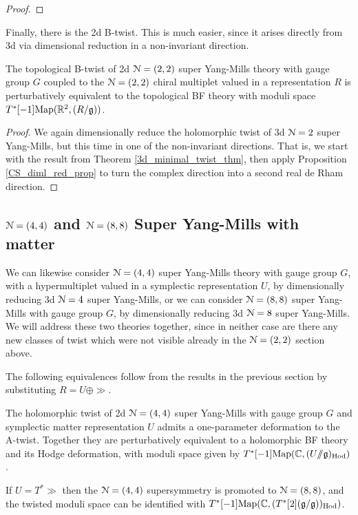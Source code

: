 \documentclass[10pt, oneside]{article}
\newcommand{\ham}{/\!\!/}
\begin{document}
\begin{proof}
 
\end{proof}

Finally, there is the 2d B-twist.  This is much easier, since it arises directly from 3d via dimensional reduction in a non-invariant direction.
\begin{theorem} \label{2d_2_B_twist_thm}
The topological B-twist of 2d $\mathcal{N}=(2,2)$ super Yang-Mills theory with gauge group $G$ coupled to the $\mathcal{N}=(2,2)$ chiral multiplet valued in a representation $R$ is perturbatively equivalent to the topological BF theory with moduli space $T^*[-1]\mathrm{Map}(\mathbb R^2, (R/\mathfrak{g}))$.
\end{theorem}

\begin{proof}
We again dimensionally reduce the holomorphic twist of 3d $\mathcal{N}=2$ super Yang-Mills, but this time in one of the non-invariant directions.  That is, we start with the result from Theorem \ref{3d_minimal_twist_thm}, then apply Proposition \ref{CS_diml_red_prop} to turn the complex direction into a second real de Rham direction.
\end{proof}

\subsection{\texorpdfstring{$\mathcal N=(4,4)$}{N=(4,4)} and \texorpdfstring{$\mathcal N=(8,8)$}{N=(8,8)} Super Yang-Mills with matter} \label{sec:2d(4,4)}
We can likewise consider $\mathcal{N}=(4,4)$ super Yang-Mills theory with gauge group $G$, with a hypermultiplet valued in a symplectic representation $U$, by dimensionally reducing 3d $\mathcal{N}=4$ super Yang-Mills, or we can consider $\mathcal{N}=(8,8)$ super Yang-Mills with gauge group $G$, by dimensionally reducing 3d $\mathcal{N}=8$ super Yang-Mills.  We will address these two theories together, since in neither case are there any new classes of twist which were not visible already in the $\mathcal{N}=(2,2)$ section above.  

The following equivalences follow from the results in the previous section by substituting $R = U \oplus \gg$.

\begin{theorem}
The holomorphic twist of 2d $\mathcal{N}=(4,4)$ super Yang-Mills with gauge group $G$ and symplectic matter representation $U$ admits a one-parameter deformation to the A-twist.  Together they are perturbatively equivalent to a holomorphic BF theory and its Hodge deformation, with moduli space given by $T^*[-1]\mr{Map}(\CC, (U \ham \gg)_{\mr{Hod}})$.

If $U = T^*\gg$ then the $\mathcal{N}=(4,4)$ supersymmetry is promoted to $\mathcal{N}=(8,8)$, and the twisted moduli space can be identified with  $T^*[-1]\mathrm{Map}(\mathbb C, (T^*[2](\mathfrak{g} / \mathfrak{g}))_{\mathrm{Hod}})$.
\end{theorem}
\end{document}
